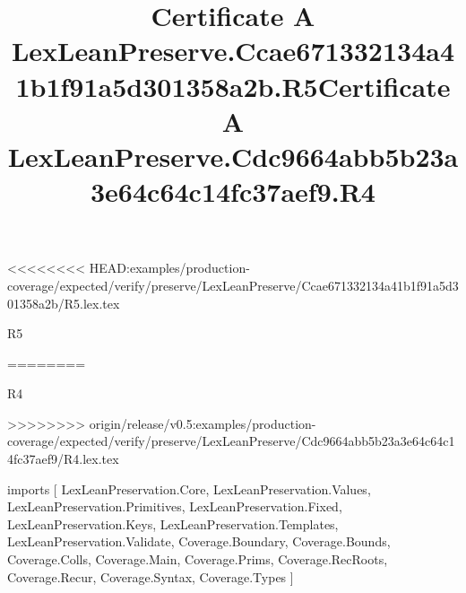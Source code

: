 <<<<<<<< HEAD:examples/production-coverage/expected/verify/preserve/LexLeanPreserve/Ccae671332134a41b1f91a5d301358a2b/R5.lex.tex
\begin{lexlean}{R5}
\title{Certificate A LexLeanPreserve.Ccae671332134a41b1f91a5d301358a2b.R5}
========
\begin{lexlean}{R4}
\title{Certificate A LexLeanPreserve.Cdc9664abb5b23a3e64c64c14fc37aef9.R4}
>>>>>>>> origin/release/v0.5:examples/production-coverage/expected/verify/preserve/LexLeanPreserve/Cdc9664abb5b23a3e64c64c14fc37aef9/R4.lex.tex
\begin{coremodule}
imports [
  LexLeanPreservation.Core,
  LexLeanPreservation.Values,
  LexLeanPreservation.Primitives,
  LexLeanPreservation.Fixed,
  LexLeanPreservation.Keys,
  LexLeanPreservation.Templates,
  LexLeanPreservation.Validate,
  Coverage.Boundary,
  Coverage.Bounds,
  Coverage.Colls,
  Coverage.Main,
  Coverage.Prims,
  Coverage.RecRoots,
  Coverage.Recur,
  Coverage.Syntax,
  Coverage.Types
]


\end{coremodule}
\end{lexlean}
\end{lexlean}
